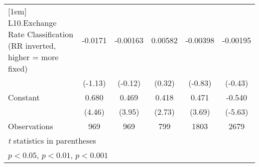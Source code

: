 {\begin{longtable}{l*{5}{c}}
[1em]
L10.Exchange Rate Classification (RR inverted, higher = more fixed)&  -0.0171         & -0.00163         &  0.00582         & -0.00398         & -0.00195         \\
                &  (-1.13)         &  (-0.12)         &   (0.32)         &  (-0.83)         &  (-0.43)         \\
[1em]
Constant        &    0.680\sym{***}&    0.469\sym{***}&    0.418\sym{**} &    0.471\sym{***}&   -0.540\sym{***}\\
                &   (4.46)         &   (3.95)         &   (2.73)         &   (3.69)         &  (-5.63)         \\
\hline
Observations    &      969         &      969         &      799         &     1803         &     2679         \\
\hline\hline
\multicolumn{6}{l}{\footnotesize \textit{t} statistics in parentheses}\\
\multicolumn{6}{l}{\footnotesize \sym{*} \(p<0.05\), \sym{**} \(p<0.01\), \sym{***} \(p<0.001\)}\\
\end{longtable}
}
